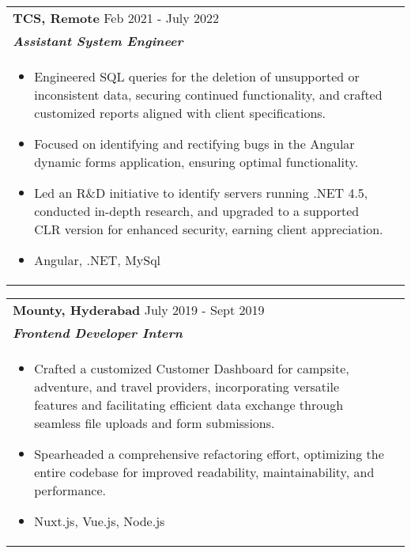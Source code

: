 \documentclass[a4paper,8pt]{article}
\begin{document}
\begin{tabularx}{\linewidth}{ @{}l r@{} }
\color[HTML]{1C033C} \textbf{{TCS, Remote}} \hfill \color[HTML]{371e77} Feb 2021 - July 2022 \\[4pt]
\color[HTML]{371e77}\textbf{\textit{Assistant System Engineer}}\ \hfill \color[HTML]{4B28A4} \\[5pt]
\begin{minipage}[t]{\linewidth}
    \begin{itemize}[nosep,after=\strut, leftmargin=2em, itemsep=2pt]
        \item Engineered SQL queries for the deletion of unsupported or inconsistent data, securing continued functionality, and crafted customized reports aligned with client specifications.
        \item Focused on identifying and rectifying bugs in the Angular dynamic forms application, ensuring optimal functionality.
        \item Led an R\&D initiative to identify servers running .NET 4.5, conducted in-depth research, and upgraded to a supported CLR version for enhanced security, earning client appreciation.
         \item Angular, .NET, MySql
    \end{itemize}
\end{minipage}
\end{tabularx}

\begin{tabularx}{\linewidth}{ @{}l r@{} }
\color[HTML]{1C033C} \textbf{Mounty, Hyderabad} \hfill \color[HTML]{371e77} July 2019 - Sept 2019 \\[4pt]
\color[HTML]{371e77}\textbf{\textit{Frontend Developer Intern}} \hfill \color[HTML]{4B28A4} \\[5pt]
\begin{minipage}[t]{\linewidth}
    \begin{itemize}[nosep,after=\strut, leftmargin=2em, itemsep=2pt]
        \item Crafted a customized Customer Dashboard for campsite, adventure, and travel providers, incorporating versatile features and facilitating efficient data exchange through seamless file uploads and form submissions.
        \item Spearheaded a comprehensive refactoring effort, optimizing the entire codebase for improved readability, maintainability, and performance.
        \item Nuxt.js, Vue.js, Node.js
    \end{itemize}
    \end{minipage}
\end{tabularx}\\[3pt]
\end{document}
